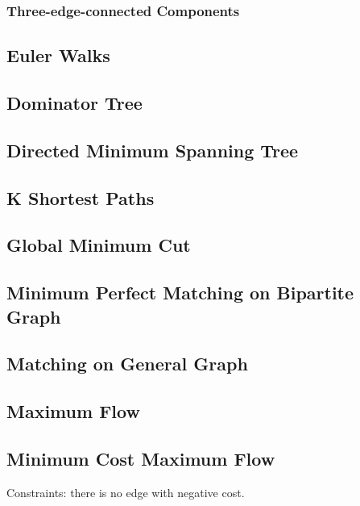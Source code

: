 \documentclass{article}
\begin{document}
\begin{multicols}{2}
    \subsubsection{Three-edge-connected Components}
    

    \subsection{Euler Walks}
    

    \subsection{Dominator Tree}
    

    \subsection{Directed Minimum Spanning Tree}
    

    \subsection{K Shortest Paths}
    

    \subsection{Global Minimum Cut}
    

    \subsection{Minimum Perfect Matching on Bipartite Graph}
    

    \subsection{Matching on General Graph}
    

    \subsection{Maximum Flow}
    

    \subsection{Minimum Cost Maximum Flow}
    Constraints: there is no edge with negative cost.
    


\end{multicols}
\end{document}
